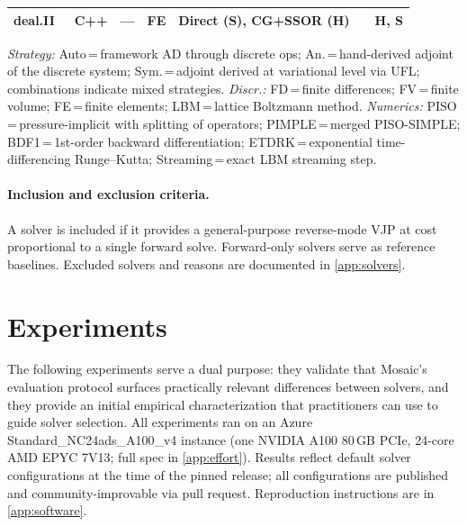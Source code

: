 \documentclass{article}
\begin{document}
\begin{table}[t]
{\begin{tabular}{@{}llllll c@{}}
    deal.II~\cite{bangerth2007dealii,arndt2023dealii}
      & C++ & --- & FE & Direct (S), CG+SSOR (H) & & H, S \\
    \bottomrule
  \end{tabular}}
  \par\vspace{4pt}
  \begin{minipage}{\linewidth}\footnotesize\raggedright
    \textit{Strategy:}
    Auto\,=\,framework AD through discrete ops;
    An.\,=\,hand-derived adjoint of the discrete system;
    Sym.\,=\,adjoint derived at variational level via UFL;
    combinations indicate mixed strategies.
    \textit{Discr.:}
    FD\,=\,finite differences;
    FV\,=\,finite volume;
    FE\,=\,finite elements;
    LBM\,=\,lattice Boltzmann method.
    \textit{Numerics:}
    PISO\,=\,pressure-implicit with splitting of operators;
    PIMPLE\,=\,merged PISO-SIMPLE;
    BDF1\,=\,1st-order backward differentiation;
    ETDRK\,=\,exponential time-differencing Runge--Kutta;
    Streaming\,=\,exact LBM streaming step.
  \end{minipage}
\end{table}

\paragraph{Inclusion and exclusion criteria.}
A solver is included if it provides a general-purpose reverse-mode VJP
at cost proportional to a single forward solve. Forward-only solvers
serve as reference baselines. Excluded solvers and reasons are documented
in \cref{app:solvers}.

\section{Experiments}
\label{sec:experiments}

The following experiments serve a dual purpose: they validate that
Mosaic's evaluation protocol surfaces practically relevant differences
between solvers, and they provide an initial empirical characterization
that practitioners can use to guide solver selection.
All experiments ran on an Azure Standard\_NC24ads\_A100\_v4 instance
(one NVIDIA A100 80\,GB PCIe, 24-core AMD EPYC 7V13; full spec in \cref{app:effort}).
Results reflect default solver configurations at the time of the pinned
release; all configurations are published and community-improvable via
pull request. Reproduction instructions are in \cref{app:software}.
\end{document}
